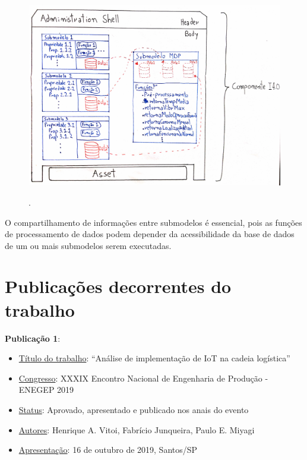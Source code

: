 \documentclass[
	12pt,				%
	oneside,			%
	a4paper,			%
	english,			%
	brazil				%
]{abntex2}
\begin{document}
	\begin{figure}[H]
		\centering
		\caption{.}
		\includegraphics[width=1\textwidth]{submodeloMDP.png}
		\label{fig:submodeloMDP}
	\end{figure}

	O compartilhamento de informações entre submodelos é essencial, pois as funções de processamento de dados podem depender da acessibilidade da base de dados de um ou mais submodelos serem executadas. 
	
	

\chapter{Publicações decorrentes do trabalho}

	\textbf{Publicação 1}:
	\begin{itemize}
		\item \underline{Título do trabalho}: “Análise de implementação de IoT na cadeia logística”
		\item \underline{Congresso}: XXXIX Encontro Nacional de Engenharia de Produção - ENEGEP 2019
		\item \underline{Status}: Aprovado, apresentado e publicado nos anais do evento
		\item \underline{Autores}:  Henrique A. Vitoi, Fabrício Junqueira, Paulo E. Miyagi
		\item \underline{Apresentação}: 16 de outubro de 2019, Santos/SP
	\end{itemize}
	
	\bigskip
	
\end{document}

